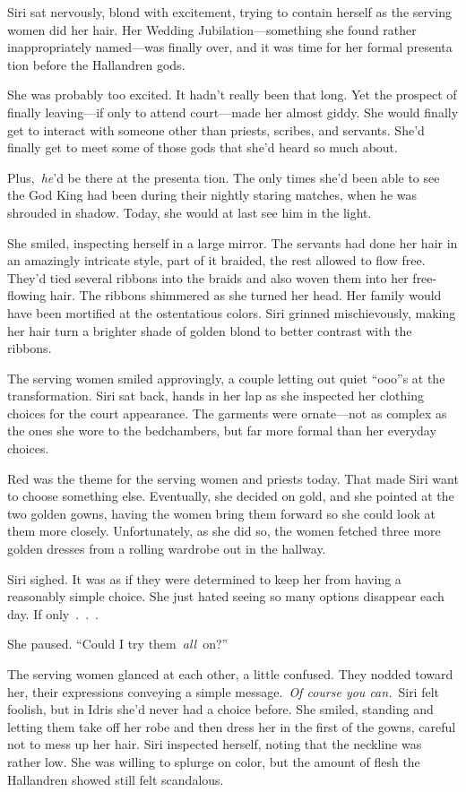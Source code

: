 \orn

Siri sat nervously, blond with excitement, trying to contain herself as the serving women did her hair. Her Wedding Jubilation—something she found rather inappropriately named—was finally over, and it was time for her formal presenta tion before the Hallandren gods.

She was probably too excited. It hadn’t really been that long. Yet the prospect of finally leaving—if only to attend court—made her almost giddy. She would finally get to interact with someone other than priests, scribes, and servants. She’d finally get to meet some of those gods that she’d heard so much about.

Plus,~\textit{he}’d be there at the presenta tion. The only times she’d been able to see the God King had been during their nightly staring matches, when he was shrouded in shadow. Today, she would at last see him in the light.

She smiled, inspecting herself in a large mirror. The servants had done her hair in an amazingly intricate style, part of it braided, the rest allowed to flow free. They’d tied several ribbons into the braids and also woven them into her free-flowing hair. The ribbons shimmered as she turned her head. Her family would have been mortified at the ostentatious colors. Siri grinned mischievously, making her hair turn a brighter shade of golden blond to better contrast with the ribbons.

The serving women smiled approvingly, a couple letting out quiet “ooo”s at the transformation. Siri sat back, hands in her lap as she inspected her clothing choices for the court appearance. The garments were ornate—not as complex as the ones she wore to the bedchambers, but far more formal than her everyday choices.

Red was the theme for the serving women and priests today. That made Siri want to choose something else. Eventually, she decided on gold, and she pointed at the two golden gowns, having the women bring them forward so she could look at them more closely. Unfortunately, as she did so, the women fetched three more golden dresses from a rolling wardrobe out in the hallway.

Siri sighed. It was as if they were determined to keep her from having a reasonably simple choice. She just hated seeing so many options disappear each day. If only~.~.~.

She paused. “Could I try them~\textit{all}~on?”

The serving women glanced at each other, a little confused. They nodded toward her, their expressions conveying a simple message.~\textit{Of course you can.}~Siri felt foolish, but in Idris she’d never had a choice before. She smiled, standing and letting them take off her robe and then dress her in the first of the gowns, careful not to mess up her hair. Siri inspected herself, noting that the neckline was rather low. She was willing to splurge on color, but the amount of flesh the Hallandren showed still felt scandalous.

